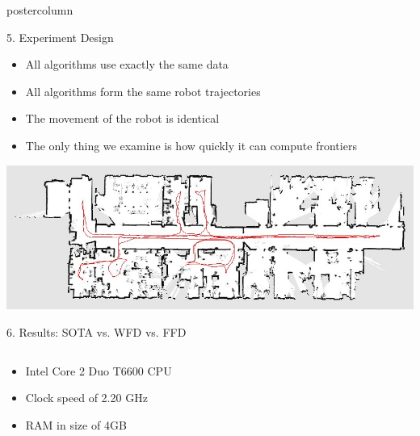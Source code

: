 \begin{beamercolorbox}[center,wd=\textwidth]{postercolumn}
\begin{minipage}[T]{.95\textwidth}
{\begin{block}{5. Experiment Design}
\begin{itemize}
\begin{itemize}
                	  \item All algorithms use exactly the same data
                	  \item All algorithms form the same robot trajectories
                	  \item The movement of the robot is identical
                	  \item The only thing we examine is how quickly it can compute
                	  frontiers
                	\end{itemize} 
              \end{itemize}
              \includegraphics[width=0.5\linewidth]{images/freiburg.JPG}
              
            \end{block}
            \vfill
            
            \begin{block}{6. Results: SOTA vs. WFD vs. FFD}
             \begin{columns}
                \begin{column}{.5\textwidth}
                  \begin{itemize}
		              \item Intel Core 2 Duo T6600 CPU
		              \item Clock speed of 2.20 GHz
		              \item RAM in size of 4GB
		              

\end{itemize}
\end{column}
\end{columns}
\end{block}}
\end{minipage}
\end{beamercolorbox}
